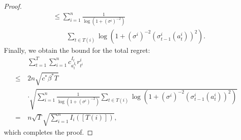 \documentclass[letterpaper]{vldb}
\begin{document}
\begin{proof}
\begin{align*}
    & \le \sum_{i=1}^n \frac{1}{\log\left(1 + (\sigma^i)^{-2}\right)}\\
    &\qquad \sum_{t\in T(i)} \log\left(1 + (\sigma^i)^{-2} (\sigma^i_{t-1}(a^i_{t}))^2\right).
  \end{align*}
  Finally, we obtain the bound for the total regret:
  \begin{align*}
    & \sum_{t=1}^T \sum_{i=1}^n c^{I_t}_{a^{I_t}_t} r^i_{t^i}\\
     \le \ & 2n \sqrt{c^\ast \beta^\ast T}\\
    & \cdot \sqrt{\sum_{i=1}^n \frac{1}{\log\left(1 + (\sigma^i)^{-2}\right)} \sum_{t\in T(i)} \log\left(1 + (\sigma^i)^{-2} (\sigma^i_{t-1}(a^i_{t}))^2\right)}\\
    =\ & n \sqrt{T} \sqrt{\sum_{i=1}^n I_i([T(i)])},
  \end{align*}
 which completes the proof.
\end{proof}
\end{document}
